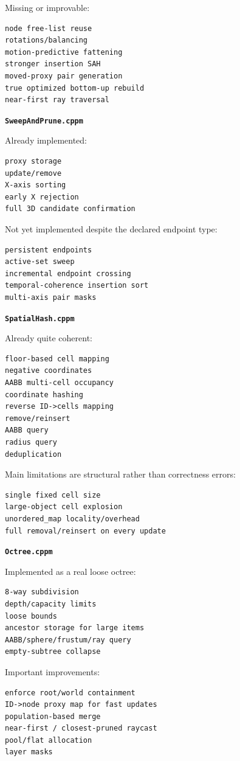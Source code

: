 Missing or improvable:

\begin{verbatim}
node free-list reuse
rotations/balancing
motion-predictive fattening
stronger insertion SAH
moved-proxy pair generation
true optimized bottom-up rebuild
near-first ray traversal
\end{verbatim}

\textbf{\texttt{SweepAndPrune.cppm}}

Already implemented:

\begin{verbatim}
proxy storage
update/remove
X-axis sorting
early X rejection
full 3D candidate confirmation
\end{verbatim}

Not yet implemented despite the declared endpoint type:

\begin{verbatim}
persistent endpoints
active-set sweep
incremental endpoint crossing
temporal-coherence insertion sort
multi-axis pair masks
\end{verbatim}

\textbf{\texttt{SpatialHash.cppm}}

Already quite coherent:

\begin{verbatim}
floor-based cell mapping
negative coordinates
AABB multi-cell occupancy
coordinate hashing
reverse ID->cells mapping
remove/reinsert
AABB query
radius query
deduplication
\end{verbatim}

Main limitations are structural rather than correctness errors:

\begin{verbatim}
single fixed cell size
large-object cell explosion
unordered_map locality/overhead
full removal/reinsert on every update
\end{verbatim}

\textbf{\texttt{Octree.cppm}}

Implemented as a real loose octree:

\begin{verbatim}
8-way subdivision
depth/capacity limits
loose bounds
ancestor storage for large items
AABB/sphere/frustum/ray query
empty-subtree collapse
\end{verbatim}

Important improvements:

\begin{verbatim}
enforce root/world containment
ID->node proxy map for fast updates
population-based merge
near-first / closest-pruned raycast
pool/flat allocation
layer masks
\end{verbatim}

